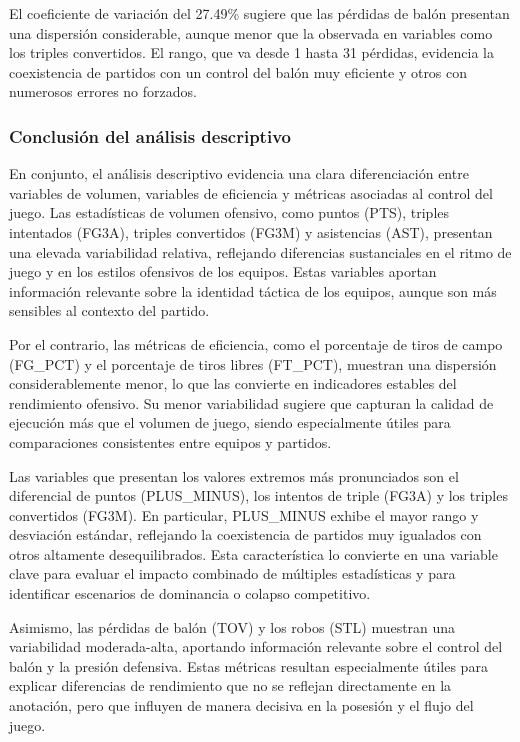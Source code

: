 \documentclass[12pt]{article}
\begin{document}
El coeficiente de variación del 27.49\% sugiere que las pérdidas de balón presentan una dispersión
considerable, aunque menor que la observada en variables como los triples convertidos. El rango,
que va desde 1 hasta 31 pérdidas, evidencia la coexistencia de partidos con un control del balón
muy eficiente y otros con numerosos errores no forzados.


\subsubsection*{Conclusión del análisis descriptivo}

En conjunto, el análisis descriptivo evidencia una clara diferenciación entre variables de volumen,
variables de eficiencia y métricas asociadas al control del juego. Las estadísticas de volumen
ofensivo, como puntos (PTS), triples intentados (FG3A), triples convertidos (FG3M) y asistencias
(AST), presentan una elevada variabilidad relativa, reflejando diferencias sustanciales en el ritmo
de juego y en los estilos ofensivos de los equipos. Estas variables aportan información relevante
sobre la identidad táctica de los equipos, aunque son más sensibles al contexto del partido.

Por el contrario, las métricas de eficiencia, como el porcentaje de tiros de campo (FG\_PCT) y el
porcentaje de tiros libres (FT\_PCT), muestran una dispersión considerablemente menor, lo que las
convierte en indicadores estables del rendimiento ofensivo. Su menor variabilidad sugiere que
capturan la calidad de ejecución más que el volumen de juego, siendo especialmente útiles para
comparaciones consistentes entre equipos y partidos.

Las variables que presentan los valores extremos más pronunciados son el diferencial de puntos
(PLUS\_MINUS), los intentos de triple (FG3A) y los triples convertidos (FG3M). En particular,
PLUS\_MINUS exhibe el mayor rango y desviación estándar, reflejando la coexistencia de partidos muy
igualados con otros altamente desequilibrados. Esta característica lo convierte en una variable
clave para evaluar el impacto combinado de múltiples estadísticas y para identificar escenarios de
dominancia o colapso competitivo.

Asimismo, las pérdidas de balón (TOV) y los robos (STL) muestran una variabilidad moderada-alta,
aportando información relevante sobre el control del balón y la presión defensiva. Estas métricas
resultan especialmente útiles para explicar diferencias de rendimiento que no se reflejan
directamente en la anotación, pero que influyen de manera decisiva en la posesión y el flujo del
juego.
\end{document}
